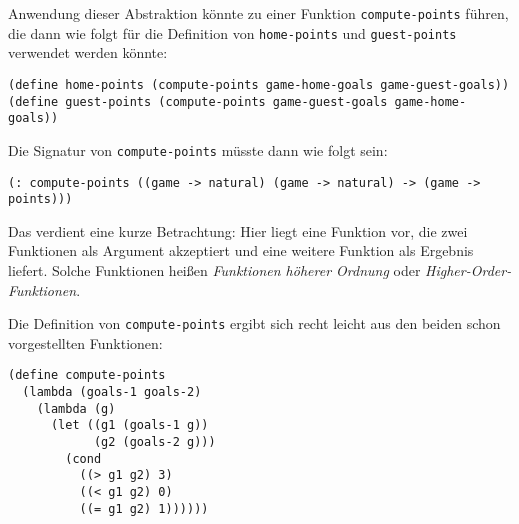 Anwendung dieser Abstraktion könnte zu einer Funktion \texttt{compute-points}
führen, die dann wie folgt für die Definition von \texttt{home-points} und
\texttt{guest-points} verwendet werden könnte:

\begin{verbatim}
(define home-points (compute-points game-home-goals game-guest-goals))
(define guest-points (compute-points game-guest-goals game-home-goals))
\end{verbatim}

Die Signatur von \texttt{compute-points} müsste dann wie folgt sein:
\begin{verbatim}
(: compute-points ((game -> natural) (game -> natural) -> (game -> points)))
\end{verbatim}
Das verdient eine kurze Betrachtung: Hier liegt eine Funktion vor, die zwei
Funktionen als Argument akzeptiert und eine weitere Funktion als Ergebnis
liefert. Solche Funktionen heißen \textit{Funktionen höherer Ordnung} oder
\textit{Higher-Order-Funktionen}. 

Die Definition von \texttt{compute-points} ergibt sich recht leicht aus den
beiden schon vorgestellten Funktionen:
\begin{verbatim}
(define compute-points
  (lambda (goals-1 goals-2)
    (lambda (g)
      (let ((g1 (goals-1 g))
            (g2 (goals-2 g)))
        (cond
          ((> g1 g2) 3)
          ((< g1 g2) 0)
          ((= g1 g2) 1))))))
\end{verbatim}


